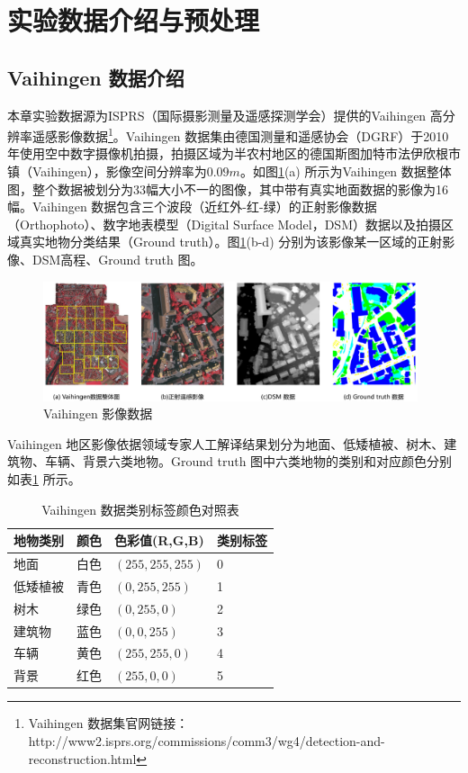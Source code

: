 \section{实验数据介绍与预处理}
\label{sec:second}

\subsection{Vaihingen 数据介绍}
\label{sec:second-1}
本章实验数据源为ISPRS（国际摄影测量及遥感探测学会）提供的Vaihingen 高分辨率遥感影像数据\footnote{Vaihingen 数据集官网链接：http://www2.isprs.org/commissions/comm3/wg4/detection-and-reconstruction.html}。Vaihingen 数据集由德国测量和遥感协会（DGRF）于2010年使用空中数字摄像机拍摄，拍摄区域为半农村地区的德国斯图加特市法伊欣根市镇（Vaihingen），影像空间分辨率为$0.09m$。如图\ref{fig:vaihingen}(a) 所示为Vaihingen 数据整体图，整个数据被划分为33幅大小不一的图像，其中带有真实地面数据的影像为16幅。Vaihingen 数据包含三个波段（近红外-红-绿）的正射影像数据（Orthophoto）、数字地表模型（Digital Surface Model，DSM）数据以及拍摄区域真实地物分类结果（Ground truth）。图\ref{fig:vaihingen}(b-d) 分别为该影像某一区域的正射影像、DSM高程、Ground truth 图。

\begin{figure}[!htb]
  \centering
  \includegraphics[width=0.98\textwidth]{figures/vaihingen2}
  \caption{Vaihingen 影像数据}\label{fig:vaihingen}
\end{figure}

Vaihingen 地区影像依据领域专家人工解译结果划分为地面、低矮植被、树木、建筑物、车辆、背景六类地物。Ground truth 图中六类地物的类别和对应颜色分别如表\ref{tab:vaih_gt} 所示。

\begin{table}[!htbp]
  \caption{Vaihingen 数据类别标签颜色对照表}\label{tab:vaih_gt}
  \centering
  \footnotesize

  \begin{tabular}{p{2cm}p{2cm}p{3cm}p{2cm}}
    \toprule
    地物类别 & 颜色 & 色彩值(R,G,B)   & 类别标签 \\
    \midrule
    地面     & 白色 & $(255,255,255)$ & 0        \\
    低矮植被 & 青色 & $(0,255,255)$   & 1        \\
    树木     & 绿色 & $(0,255,0)$     & 2        \\
    建筑物   & 蓝色 & $(0,0,255) $    & 3        \\
    车辆     & 黄色 & $(255,255,0)$   & 4        \\
    背景     & 红色 & $(255,0,0) $    & 5        \\
    \bottomrule
  \end{tabular}
\end{table}

